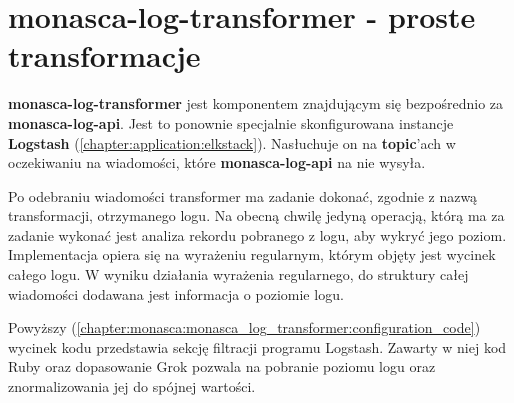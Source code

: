 \section{monasca-log-transformer - proste transformacje}
\label{chapter:monasca:monasca_log_transformer}

\textbf{monasca-log-transformer} jest komponentem znajdującym się bezpośrednio \linebreak za \textbf{monasca-log-api}. Jest to ponownie specjalnie skonfigurowana instancje
\textbf{Logstash} (\ref{chapter:application:elkstack}). Nasłuchuje on na \textbf{topic}'ach w oczekiwaniu
na wiadomości, które \textbf{monasca-log-api} na nie wysyła. 

Po odebraniu wiadomości transformer ma zadanie dokonać, zgodnie z nazwą transformacji, otrzymanego 
logu. Na obecną chwilę jedyną operacją, którą ma za zadanie wykonać jest analiza rekordu pobranego z logu,
aby wykryć jego poziom. Implementacja opiera się na wyrażeniu regularnym, którym objęty jest wycinek
całego logu. W wyniku działania wyrażenia regularnego, do struktury całej wiadomości dodawana jest informacja
o poziomie logu. 


Powyższy (\ref{chapter:monasca:monasca_log_transformer:configuration_code}) wycinek kodu przedstawia
sekcję filtracji programu Logstash. Zawarty w niej kod Ruby oraz dopasowanie Grok pozwala na 
pobranie poziomu logu oraz znormalizowania jej do spójnej wartości. 